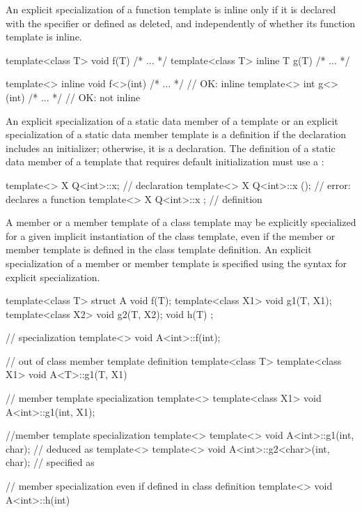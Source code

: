 \pnum
An explicit specialization of a function template is inline
only if it is declared with the 
specifier or defined as deleted, and independently of whether its
function template is inline.
\enterexample

\begin{codeblock}
template<class T> void f(T) { /* ... */ }
template<class T> inline T g(T) { /* ... */ }

template<> inline void f<>(int) { /* ... */ }   // OK: inline
template<> int g<>(int) { /* ... */ }           // OK: not inline
\end{codeblock}
\exitexample

\pnum
An explicit specialization of a static data member of a template
or an explicit specialization of a static data member template is a
definition if the declaration includes an initializer;
otherwise, it is a declaration.
\enternote
The definition of a static data member of a template
that requires default initialization must use a :

\begin{codeblock}
template<> X Q<int>::x;         // declaration
template<> X Q<int>::x ();      // error: declares a function
template<> X Q<int>::x { };     // definition
\end{codeblock}
\exitnote

\pnum
A member or a member template of a class template may be explicitly specialized
for a given implicit instantiation of the class template, even if the member
or member template is defined in the class template definition.
An explicit specialization of a member or member template is specified using the
syntax for explicit specialization.
\enterexample

\begin{codeblock}
template<class T> struct A {
  void f(T);
  template<class X1> void g1(T, X1);
  template<class X2> void g2(T, X2);
  void h(T) { }
};

// specialization
template<> void A<int>::f(int);

// out of class member template definition
template<class T> template<class X1> void A<T>::g1(T, X1) { }

// member template specialization
template<> template<class X1> void A<int>::g1(int, X1);

//member template specialization
template<> template<>
  void A<int>::g1(int, char);           //  deduced as 
template<> template<>
  void A<int>::g2<char>(int, char);     //  specified as 

// member specialization even if defined in class definition
template<> void A<int>::h(int) { }
\end{codeblock}
\exitexample

